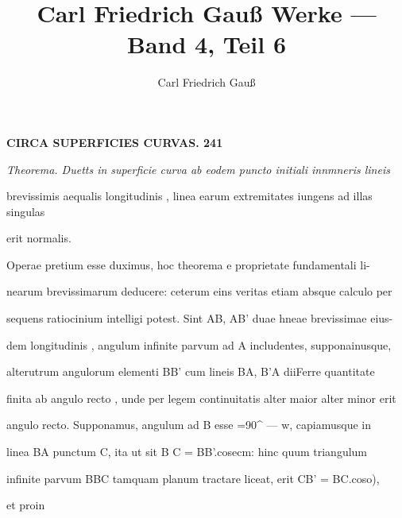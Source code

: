 \documentclass[12pt,a4paper]{article}
\begin{document}
\title{Carl Friedrich Gau\ss{} Werke --- Band 4, Teil 6}
\author{Carl Friedrich Gau\ss{}}
\date{}
\maketitle
\thispagestyle{empty}

\newpage

\newpage
\setcounter{page}{241}

\noindent\textbf{CIRCA  SUPERFICIES  CURVAS.  241}\par

\par\noindent\textit{Theorema.  Duetts  in  superficie  curva  ab  eodem  puncto  initiali  innmneris  lineis}

brevissimis  aequalis  longitudinis ,  linea  earum  extremitates  iungens  ad  illas  singulas

erit  normalis.

Operae  pretium  esse  duximus,  hoc  theorema  e  proprietate  fundamentali  li-

nearum  brevissimarum  deducere:  ceterum  eins  veritas  etiam  absque  calculo  per

sequens  ratiocinium  intelligi  potest.  Sint  AB,  AB'  duae  hneae  brevissimae  eius-

dem  longitudinis ,  angulum  infinite  parvum  ad  A  includentes,  supponainusque,

alterutrum  angulorum  elementi  BB'  cum  lineis  BA,  B'A  diiFerre  quantitate

finita  ab  angulo  recto ,  unde  per  legem  continuitatis  alter  maior  alter  minor  erit

angulo  recto.  Supponamus,  angulum  ad  B  esse  =90^  —  w,  capiamusque  in

linea  BA  punctum  C,  ita  ut  sit  B  C  =  BB'.cosecm:  hinc  quum  triangulum

infinite  parvum  BBC  tamquam  planum  tractare  liceat,  erit  CB' =  BC.coso),

et  proin
\end{document}
